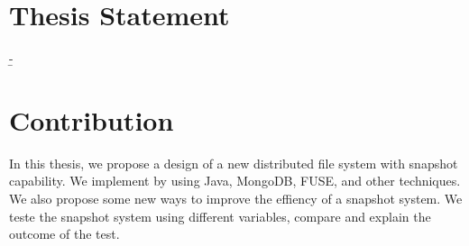 \section{Thesis Statement}
   \b{-} 

\section{Contribution}

    In this thesis, we propose a design of a new distributed file system with snapshot capability. We implement by using Java, MongoDB, FUSE, and other techniques. We also propose some new ways to improve the effiency of a snapshot system. We teste the snapshot system using different variables, compare and explain the outcome of the test.
